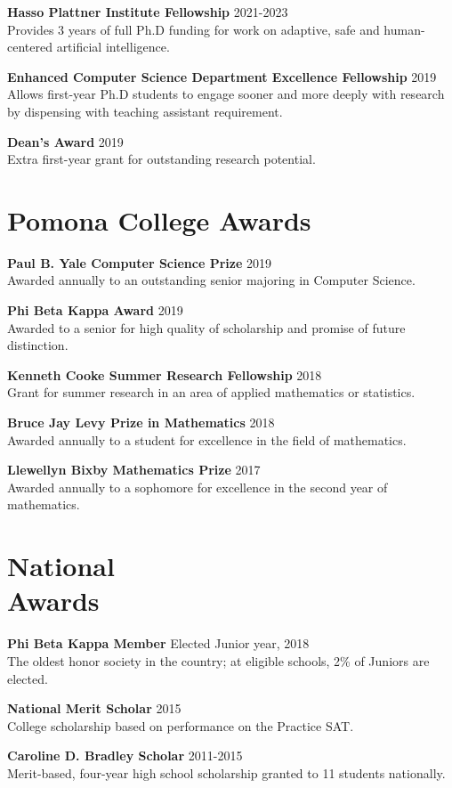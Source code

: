 \documentclass[margin]{res}
\begin{document}
\begin{resume}
\textbf{Hasso Plattner Institute Fellowship} \hfill 2021-2023\\
Provides 3 years of full Ph.D funding for work on adaptive, safe and human-centered artificial intelligence.

\textbf{Enhanced Computer Science Department Excellence Fellowship} \hfill 2019\\
Allows first-year Ph.D students to engage sooner and more deeply with research by dispensing with teaching assistant requirement.

\textbf{Dean's Award} \hfill 2019\\
Extra first-year grant for outstanding research potential.


\section{Pomona College Awards}

\textbf{Paul B. Yale Computer Science Prize} \hfill 2019\\
Awarded annually to an outstanding senior majoring in Computer Science.

\textbf{Phi Beta Kappa Award} \hfill 2019\\
Awarded to a senior for high quality of scholarship and promise of future distinction.

\textbf{Kenneth Cooke Summer Research Fellowship} \hfill 2018\\
Grant for summer research in an area of applied mathematics or statistics.

\textbf{Bruce Jay Levy Prize in Mathematics} \hfill 2018\\
Awarded annually to a student for excellence in the field of mathematics.

\textbf{Llewellyn Bixby Mathematics Prize} \hfill 2017\\
Awarded annually to a sophomore for excellence in the second year of mathematics.

\section{National \\Awards}
\textbf{Phi Beta Kappa Member} \hfill Elected Junior year, 2018\\
The oldest honor society in the country; at eligible schools, 2\% of Juniors are elected.

\textbf{National Merit Scholar} \hfill 2015\\
College scholarship based on performance on the Practice SAT.

\textbf{Caroline D. Bradley Scholar} \hfill 2011-2015\\
Merit-based, four-year high school scholarship granted to 11 students nationally.

\end{resume}
\end{document}
